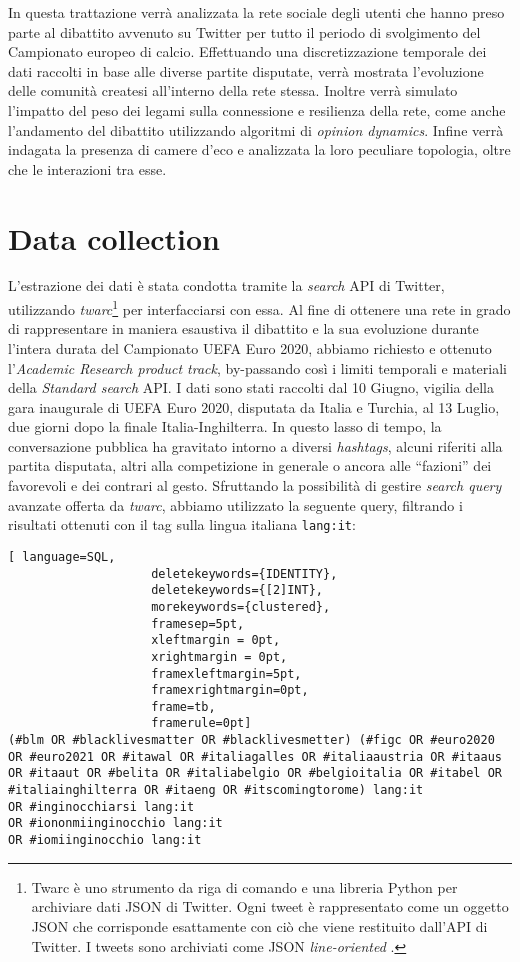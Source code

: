       In questa trattazione verrà analizzata la rete sociale degli utenti che hanno preso parte al dibattito avvenuto su Twitter per tutto il periodo di svolgimento del Campionato europeo di calcio. Effettuando una discretizzazione temporale dei dati raccolti in base alle diverse partite disputate, verrà mostrata l'evoluzione delle comunità createsi all'interno della rete stessa. Inoltre verrà simulato l'impatto del peso dei legami sulla connessione e resilienza della rete, come anche l'andamento del dibattito utilizzando algoritmi di \textit{opinion dynamics}. Infine verrà indagata la presenza di camere d'eco e analizzata la loro peculiare topologia, oltre che le interazioni tra esse.
    
    
\section{Data collection}
    L’estrazione dei dati è stata condotta tramite la \textit{search} API di Twitter, utilizzando \textit{twarc}\footnote{Twarc è uno strumento da riga di comando e una libreria Python per archiviare dati JSON di Twitter. Ogni tweet è rappresentato come un oggetto JSON che corrisponde esattamente con ciò che viene restituito dall'API di Twitter. I tweets sono archiviati come JSON \textit{line-oriented} \cite{twarc}.} per interfacciarsi con essa. 
    Al fine di ottenere una rete in grado di rappresentare in maniera esaustiva il dibattito e la sua evoluzione durante l'intera durata del Campionato UEFA Euro 2020, abbiamo richiesto e ottenuto l'\textit{Academic Research product track}, by-passando così i limiti temporali e materiali della \textit{Standard search} API. 
    I dati sono stati raccolti dal 10 Giugno, vigilia della gara inaugurale di UEFA Euro 2020, disputata da Italia e Turchia, al 13 Luglio, due giorni dopo la finale Italia-Inghilterra. In questo lasso di tempo, la conversazione pubblica ha gravitato intorno a diversi \textit{hashtags}, alcuni riferiti alla partita disputata, altri alla competizione in generale o ancora alle ``fazioni'' dei favorevoli e dei contrari al gesto. Sfruttando la possibilità di gestire \textit{search query} avanzate offerta da \textit{twarc}, abbiamo utilizzato la seguente query, filtrando i risultati ottenuti con il tag sulla lingua italiana \texttt{lang:it}: 
    
    \begin{lstlisting}[ language=SQL,
                    deletekeywords={IDENTITY},
                    deletekeywords={[2]INT},
                    morekeywords={clustered},
                    framesep=5pt,
                    xleftmargin = 0pt,
                    xrightmargin = 0pt,
                    framexleftmargin=5pt,
                    framexrightmargin=0pt,
                    frame=tb,
                    framerule=0pt]
(#blm OR #blacklivesmatter OR #blacklivesmetter) (#figc OR #euro2020 OR #euro2021 OR #itawal OR #italiagalles OR #italiaaustria OR #itaaus OR #itaaut OR #belita OR #italiabelgio OR #belgioitalia OR #itabel OR #italiainghilterra OR #itaeng OR #itscomingtorome) lang:it
OR #inginocchiarsi lang:it 
OR #iononmiinginocchio lang:it
OR #iomiinginocchio lang:it\end{lstlisting}
    
